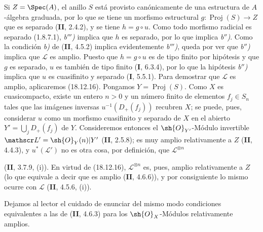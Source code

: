 Si $Z=\Spec(A)$, el anillo $S$ está provisto canónicamente de una estructura de $A$-álgebra graduada, por lo que se tiene un morfismo estructural $g:\operatorname{Proj}(S)\to Z$ que es separado (\textbf{II}, 2.4.2), y se tiene $h=g\circ u$. Como todo morfismo radicial es separado (1.8.7.1), \emph{b$'''$)} implica que $h$ es separado, por lo que implica \emph{b$''$)}. Como la condición \emph{b)} de (\textbf{II}, 4.5.2) implica evidentemente \emph{b$'''$)}, queda por ver que \emph{b$''$)} implica que $\mathscr L$ es amplio. Puesto que $h=g\circ u$ es de tipo finito por hipótesis y que $g$ es separado, $u$ es también de tipo finito (\textbf I, 6.3.4), por lo que la hipótesis \emph{b$''$)} implica que $u$ es cuasifinito y separado (\textbf I, 5.5.1). Para demostrar que $\mathscr L$ es amplio, aplicaremos (18.12.16). Pongamos $Y=\operatorname{Proj}(S)$. Como $X$ es cuasicompacto, existe un entero $n>0$ y un número finito de elementos $f_j\in S_n$ tales que las imágenes inversas $u^{-1}(D_+(f_j))$ recubren $X$; se puede, pues, considerar $u$ como un morfismo cuasifinito y separado de $X$ en el abierto
$Y'=\bigcup_j D_+(f_j)$
de $Y$. Consideremos entonces el $\sh{O}_{Y'}$-Módulo invertible
$\mathscr L'=\sh{O}_Y(n)|Y'$
(\textbf{II}, 2.5.8); es muy amplio relativamente a $Z$ (\textbf{II}, 4.4.3), y $u^*(\mathscr L')$ no es otra cosa, por definición, que $\mathscr L^{\otimes n}$


(\textbf{II}, 3.7.9, (i)). En virtud de (18.12.16), $\mathscr L^{\otimes n}$ es, pues, amplio relativamente a $Z$ (lo que equivale a decir que es amplio (\textbf{II}, 4.6.6)), y por consiguiente lo mismo ocurre con $\mathscr L$ (\textbf{II}, 4.5.6, (i)).

Dejamos al lector el cuidado de enunciar del mismo modo condiciones equivalentes a las de (\textbf{II}, 4.6.3) para los $\sh{O}_X$-Módulos relativamente amplios.
